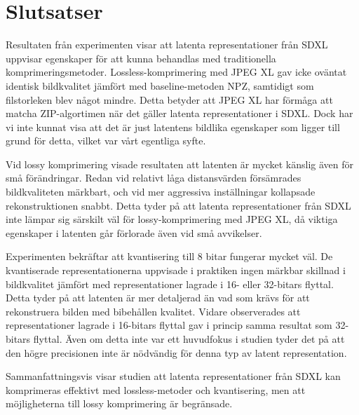 \section*{Slutsatser}

Resultaten från experimenten visar att latenta representationer från SDXL uppvisar egenskaper för att kunna behandlas med traditionella komprimeringsmetoder. Lossless-komprimering med JPEG XL gav icke oväntat identisk bildkvalitet jämfört med baseline-metoden NPZ, samtidigt som filstorleken blev något mindre. Detta betyder att JPEG XL har förmåga att matcha ZIP-algortimen när det gäller latenta representationer i SDXL. Dock har vi inte kunnat visa att det är just latentens bildlika egenskaper som ligger till grund för detta, vilket var vårt egentliga syfte.

Vid lossy komprimering visade resultaten  att latenten är mycket känslig  även för små förändringar. Redan vid relativt låga distansvärden försämrades bildkvaliteten märkbart, och vid mer aggressiva inställningar kollapsade rekonstruktionen snabbt. Detta tyder på att latenta representationer från SDXL inte lämpar sig särskilt väl för lossy-komprimering med JPEG XL, då viktiga egenskaper i latenten går förlorade även vid små avvikelser.

Experimenten bekräftar att kvantisering till 8 bitar fungerar mycket väl. De kvantiserade representationerna uppvisade i praktiken ingen märkbar skillnad i bildkvalitet jämfört med representationer lagrade i 16- eller 32-bitars flyttal. Detta tyder på att latenten är mer detaljerad än vad som krävs för att rekonstruera bilden med bibehållen kvalitet. Vidare observerades att representationer lagrade i 16-bitars flyttal gav i princip samma resultat som 32-bitars flyttal. Även om detta inte var ett huvudfokus i studien tyder det på att den högre precisionen  inte är nödvändig för denna typ av latent representation.

Sammanfattningsvis visar studien att latenta representationer från SDXL kan komprimeras effektivt med lossless-metoder och kvantisering, men att möjligheterna till lossy komprimering är begränsade.